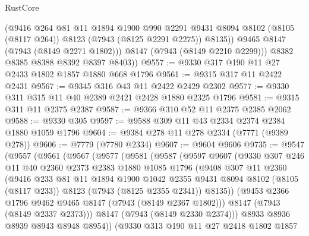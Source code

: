 \begin{lexlean}{RustCore}
\begin{coremodule}
              (@9416
                @264
                @81
                @11
                @1894
                @1900
                @990
                @2291
                @9431
                @8094
                @8102
                (@8105 (@8117 @264))
                @8123
                (@7943 (@8125 @2291 @2275))
                @8135))
            @9465
            @8147
            (@7943 (@8149 @2271 @1802)))
          @8147
          (@7943 (@8149 @2210 @2299)))
        @8382
        @8385
        @8388
        @8392
        @8397
        @8403))
@9557 := @9330 @317 @190 @11 @27 @2433 @1802 @1857 @1880 @668 @1796
@9561 := @9315 @317 @11 @2422 @2431
@9567 := @9345 @316 @43 @11 @2422 @2429 @2302
@9577 := @9330 @311 @315 @11 @40 @2389 @2421 @2428 @1880 @2325 @1796
@9581 := @9315 @311 @11 @2375 @2387
@9587 := @9366 @310 @52 @11 @2375 @2385 @2062
@9588 := @9330 @305
@9597 := @9588 @309 @11 @43 @2334 @2374 @2384 @1880 @1059 @1796
@9604 := @9384 @278 @11 @278 @2334 (@7771 (@9389 @278))
@9606 := @7779 (@7780 @2334)
@9607 := @9604 @9606
@9735 := @9547
    (@9557
      (@9561
        (@9567
          (@9577
            (@9581
              (@9587
                (@9597
                  @9607
                  (@9330
                    @307
                    @246
                    @11
                    @40
                    @2360
                    @2373
                    @2383
                    @1880
                    @1085
                    @1796
                    (@9408
                      @307
                      @11
                      @2360
                      (@9416
                        @233
                        @81
                        @11
                        @1894
                        @1900
                        @1042
                        @2355
                        @9431
                        @8094
                        @8102
                        (@8105 (@8117 @233))
                        @8123
                        (@7943 (@8125 @2355 @2341))
                        @8135))
                    (@9453 @2366 @1796 @9462 @9465 @8147 (@7943 (@8149 @2367 @1802)))
                    @8147
                    (@7943 (@8149 @2337 @2373)))
                  @8147
                  (@7943 (@8149 @2330 @2374)))
                @8933
                @8936
                @8939
                @8943
                @8948
                @8954))
            (@9330
              @313
              @190
              @11
              @27
              @2418
              @1802
              @1857

\end{coremodule}
\end{lexlean}
